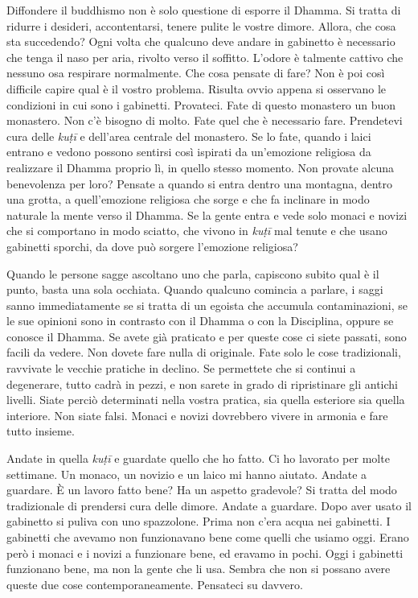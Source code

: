 Diffondere il buddhismo non è solo questione di esporre il Dhamma. Si
tratta di ridurre i desideri, accontentarsi, tenere pulite le vostre
dimore. Allora, che cosa sta succedendo? Ogni volta che qualcuno deve
andare in gabinetto è necessario che tenga il naso per aria, rivolto
verso il soffitto. L'odore è talmente cattivo che nessuno osa respirare
normalmente. Che cosa pensate di fare? Non è poi così difficile capire
qual è il vostro problema. Risulta ovvio appena si osservano le
condizioni in cui sono i gabinetti. Provateci. Fate di questo monastero
un buon monastero. Non c'è bisogno di molto. Fate quel che è necessario
fare. Prendetevi cura delle \emph{kuṭī} e dell'area centrale del
monastero. Se lo fate, quando i laici entrano e vedono possono sentirsi
così ispirati da un'emozione religiosa da realizzare il Dhamma proprio
lì, in quello stesso momento. Non provate alcuna benevolenza per loro?
Pensate a quando si entra dentro una montagna, dentro una grotta, a
quell'emozione religiosa che sorge e che fa inclinare in modo naturale
la mente verso il Dhamma. Se la gente entra e vede solo monaci e novizi
che si comportano in modo sciatto, che vivono in \emph{kuṭī} mal tenute
e che usano gabinetti sporchi, da dove può sorgere l'emozione
religiosa?

Quando le persone sagge ascoltano uno che parla, capiscono subito qual è
il punto, basta una sola occhiata. Quando qualcuno comincia a parlare, i
saggi sanno immediatamente se si tratta di un egoista che accumula
contaminazioni, se le sue opinioni sono in contrasto con il Dhamma o con
la Disciplina, oppure se conosce il Dhamma. Se avete già praticato e per
queste cose ci siete passati, sono facili da vedere. Non dovete fare
nulla di originale. Fate solo le cose tradizionali, ravvivate le vecchie
pratiche in declino. Se permettete che si continui a degenerare, tutto
cadrà in pezzi, e non sarete in grado di ripristinare gli antichi
livelli. Siate perciò determinati nella vostra pratica, sia quella
esteriore sia quella interiore. Non siate falsi. Monaci e novizi
dovrebbero vivere in armonia e fare tutto insieme.

Andate in quella \emph{kuṭī} e guardate quello che ho fatto. Ci ho
lavorato per molte settimane. Un monaco, un novizio e un laico mi hanno
aiutato. Andate a guardare. È un lavoro fatto bene? Ha un aspetto
gradevole? Si tratta del modo tradizionale di prendersi cura delle
dimore. Andate a guardare. Dopo aver usato il gabinetto si puliva con
uno spazzolone. Prima non c'era acqua nei gabinetti. I gabinetti che
avevamo non funzionavano bene come quelli che usiamo oggi. Erano però i
monaci e i novizi a funzionare bene, ed eravamo in pochi. Oggi i
gabinetti funzionano bene, ma non la gente che li usa. Sembra che non si
possano avere queste due cose contemporaneamente. Pensateci su davvero.

